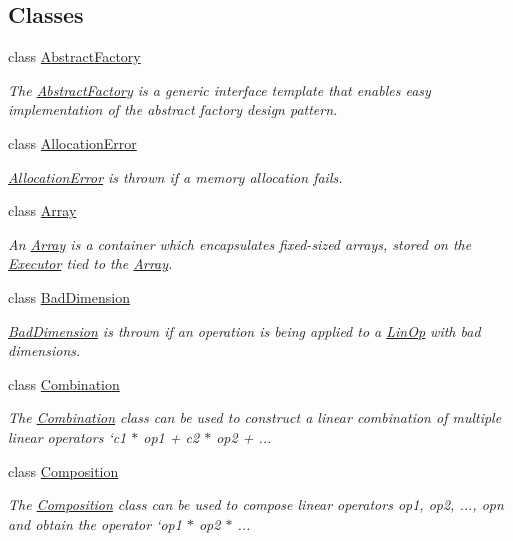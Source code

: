 \subsection*{Classes}
\begin{DoxyCompactItemize}
\item 
class \hyperlink{classgko_1_1AbstractFactory}{Abstract\+Factory}
\begin{DoxyCompactList}\small\item\em The \hyperlink{classgko_1_1AbstractFactory}{Abstract\+Factory} is a generic interface template that enables easy implementation of the abstract factory design pattern. \end{DoxyCompactList}\item 
class \hyperlink{classgko_1_1AllocationError}{Allocation\+Error}
\begin{DoxyCompactList}\small\item\em \hyperlink{classgko_1_1AllocationError}{Allocation\+Error} is thrown if a memory allocation fails. \end{DoxyCompactList}\item 
class \hyperlink{classgko_1_1Array}{Array}
\begin{DoxyCompactList}\small\item\em An \hyperlink{classgko_1_1Array}{Array} is a container which encapsulates fixed-\/sized arrays, stored on the \hyperlink{classgko_1_1Executor}{Executor} tied to the \hyperlink{classgko_1_1Array}{Array}. \end{DoxyCompactList}\item 
class \hyperlink{classgko_1_1BadDimension}{Bad\+Dimension}
\begin{DoxyCompactList}\small\item\em \hyperlink{classgko_1_1BadDimension}{Bad\+Dimension} is thrown if an operation is being applied to a \hyperlink{classgko_1_1LinOp}{Lin\+Op} with bad dimensions. \end{DoxyCompactList}\item 
class \hyperlink{classgko_1_1Combination}{Combination}
\begin{DoxyCompactList}\small\item\em The \hyperlink{classgko_1_1Combination}{Combination} class can be used to construct a linear combination of multiple linear operators `c1 $\ast$ op1 + c2 $\ast$ op2 + ... \end{DoxyCompactList}\item 
class \hyperlink{classgko_1_1Composition}{Composition}
\begin{DoxyCompactList}\small\item\em The \hyperlink{classgko_1_1Composition}{Composition} class can be used to compose linear operators {\ttfamily op1, op2, ..., opn} and obtain the operator `op1 $\ast$ op2 $\ast$ ... \end{DoxyCompactList}\item 

\end{DoxyCompactItemize}
